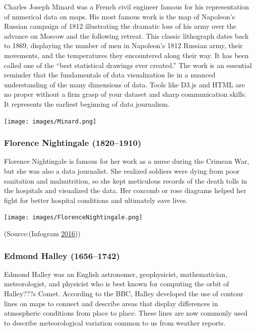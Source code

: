 \documentclass[]{book}
\begin{document}
Charles Joseph Minard was a French civil engineer famous for his representation of numerical data on maps. His most famous work is the map of Napoleon's Russian campaign of 1812 illustrating the dramatic loss of his army over the advance on Moscow and the following retreat. This classic lithograph dates back to 1869, displaying the number of men in Napoleon's 1812 Russian army, their movements, and the temperatures they encountered along their way. It has been called one of the ``best statistical drawings ever created.'' The work is an essential reminder that the fundamentals of data visualization lie in a nuanced understanding of the many dimensions of data. Tools like D3.js and HTML are no proper without a firm grasp of your dataset and sharp communication skills. It represents the earliest beginning of data journalism.

\texttt{[image: images/Minard.png]}

\hypertarget{florence-nightingale-18201910}{%
\subsubsection{Florence Nightingale (1820--1910)}\label{florence-nightingale-18201910}}

Florence Nightingale is famous for her work as a nurse during the Crimean War, but she was also a data journalist. She realized soldiers were dying from poor sanitation and malnutrition, so she kept meticulous records of the death tolls in the hospitals and visualized the data. Her coxcomb or rose diagrams helped her fight for better hospital conditions and ultimately save lives.

\texttt{[image: images/FlorenceNightingale.png]}

(Source:(Infogram \protect\hyperlink{ref-history_viz}{2016}))

\hypertarget{edmond-halley-16561742}{%
\subsubsection{Edmond Halley (1656--1742)}\label{edmond-halley-16561742}}

Edmond Halley was an English astronomer, geophysicist, mathematician, meteorologist, and physicist who is best known for computing the orbit of Halley???s Comet. According to the BBC, Halley developed the use of contour lines on maps to connect and describe areas that display differences in atmospheric conditions from place to place. These lines are now commonly used to describe meteorological variation common to us from weather reports.
\end{document}

